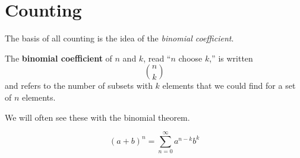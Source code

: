 \chapter{Counting}

The basis of all counting is the idea of the \emph{binomial coefficient}.
\begin{defn}
  The \textbf{binomial coefficient} of $n$ and $k$, read ``$n$ choose $k$,'' is written
  \[ n \choose k \]
  and refers to the number of subsets with $k$ elements that we could find for a set of $n$ elements.
\end{defn}

We will often see these with the binomial theorem.
\begin{theorem}
  \begin{equation}
    (a+b)^n = \sum^\infty_{n=0} a^{n-k}b^k
  \end{equation}
\end{theorem}

